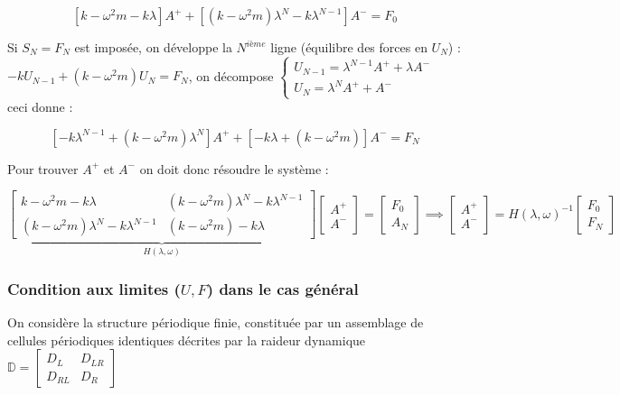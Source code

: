 \documentclass[12pt,a4paper]{article}
\begin{document}
	\[
	\left[k-\omega^2 m-k\lambda\right]A^+ + \left[(k-\omega^2 m)\lambda^N-k\lambda^{N-1}\right]A^- = F_0
	\]
	
	Si \underline{$S_N = F_N$} est imposée, on développe la $N^{ième}$ ligne (équilibre des forces en $U_N$) :\\
	$-kU_{N-1}+(k-\omega^2 m)U_N = F_N$, on décompose $\begin{cases}
		U_{N-1} = \lambda^{N-1}A^+ + \lambda A^-\\
		U_N = \lambda^N A^+ + A^-
	\end{cases}$\\
	
	ceci donne :
	
	\[
	\left[-k\lambda^{N-1}+(k-\omega^2 m)\lambda^N\right]A^+ + \left[-k\lambda+(k-\omega^2 m)\right]A^- = F_N
	\]
	
	Pour trouver $A^+$ et $A^-$ on doit donc résoudre le système :
	
	\[
	\underbrace{\begin{bmatrix}
		k-\omega^2 m - k\lambda & (k-\omega^2m)\lambda^N-k\lambda^{N-1} \\
		(k-\omega^2m)\lambda^N - k \lambda^{N-1} & (k-\omega^2 m)-k\lambda
	\end{bmatrix}}_{H(\lambda,\omega)}\begin{bmatrix}
	A^+ \\ A^-
	\end{bmatrix} = \begin{bmatrix}
	F_0 \\ A_N
	\end{bmatrix} \implies \begin{bmatrix}
	A^+ \\ A^-
	\end{bmatrix} = H(\lambda,\omega)^{-1}\begin{bmatrix}
	F_0 \\ F_N
	\end{bmatrix}
	\]
	
	
	\subsubsection{Condition aux limites ($U,F$) dans le cas général}
	
	On considère la structure périodique finie, constituée par un assemblage de cellules périodiques identiques décrites par la raideur dynamique $\mathbb D= \begin{bmatrix}
		D_L & D_{LR} \\
		D_{RL} & D_R
	\end{bmatrix}$
	
\end{document}
